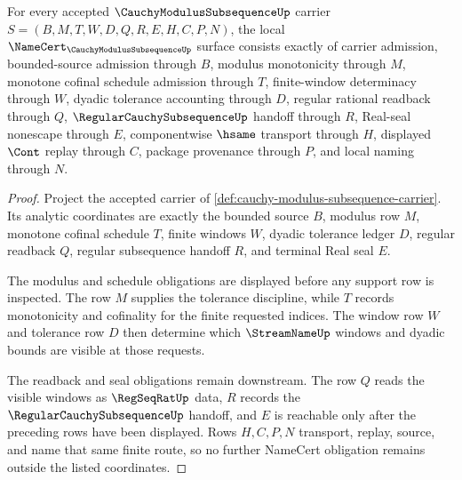 \begin{theorem}
\label{thm:cauchy-modulus-subsequence-namecert-obligations}
For every accepted $\CauchyModulusSubsequenceUp$ carrier $S=(B,M,T,W,D,Q,R,E,H,C,P,N)$, the local $\NameCert_{\CauchyModulusSubsequenceUp}$ surface consists exactly of carrier admission, bounded-source admission through $B$, modulus monotonicity through $M$, monotone cofinal schedule admission through $T$, finite-window determinacy through $W$, dyadic tolerance accounting through $D$, regular rational readback through $Q$, $\RegularCauchySubsequenceUp$ handoff through $R$, Real-seal nonescape through $E$, componentwise $\hsame$ transport through $H$, displayed $\Cont$ replay through $C$, package provenance through $P$, and local naming through $N$.
\end{theorem}
\begin{proof}
Project the accepted carrier of \autoref{def:cauchy-modulus-subsequence-carrier}. Its analytic coordinates are exactly the bounded source $B$, modulus row $M$, monotone cofinal schedule $T$, finite windows $W$, dyadic tolerance ledger $D$, regular readback $Q$, regular subsequence handoff $R$, and terminal Real seal $E$.

The modulus and schedule obligations are displayed before any support row is inspected. The row $M$ supplies the tolerance discipline, while $T$ records monotonicity and cofinality for the finite requested indices. The window row $W$ and tolerance row $D$ then determine which $\StreamNameUp$ windows and dyadic bounds are visible at those requests.

The readback and seal obligations remain downstream. The row $Q$ reads the visible windows as $\RegSeqRatUp$ data, $R$ records the $\RegularCauchySubsequenceUp$ handoff, and $E$ is reachable only after the preceding rows have been displayed. Rows $H,C,P,N$ transport, replay, source, and name that same finite route, so no further NameCert obligation remains outside the listed coordinates.
\end{proof}

